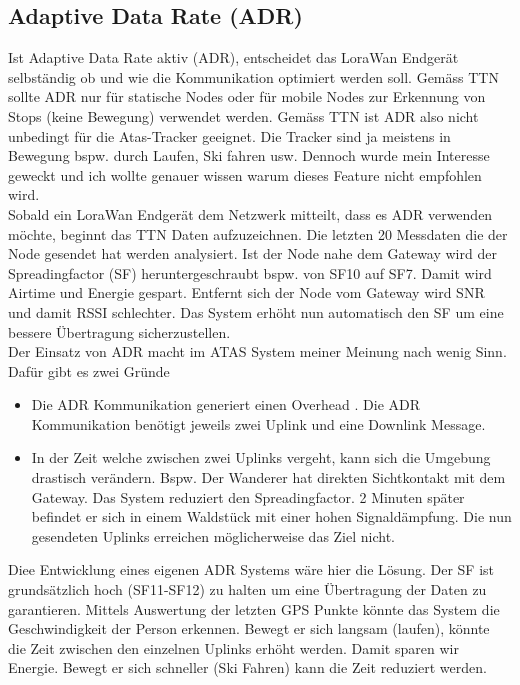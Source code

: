 \documentclass[11pt,english,german]{report}
\theoremstyle{definition}
\begin{document}
\subsection{Adaptive Data Rate (ADR)}
Ist Adaptive Data Rate aktiv (ADR), entscheidet das LoraWan Endgerät selbständig ob und wie die Kommunikation optimiert werden soll. Gemäss TTN \cite{ADRTTN} sollte ADR nur für statische Nodes oder für mobile Nodes zur Erkennung von Stops (keine Bewegung) verwendet werden. Gemäss TTN ist ADR also nicht unbedingt für die Atas-Tracker geeignet. Die Tracker sind ja meistens in Bewegung bspw. durch Laufen, Ski fahren usw. Dennoch wurde mein Interesse geweckt und ich wollte genauer wissen warum dieses Feature nicht empfohlen wird.\\[0.3cm]
Sobald ein LoraWan Endgerät dem Netzwerk mitteilt, dass es ADR verwenden möchte, beginnt das TTN Daten aufzuzeichnen. Die letzten 20 Messdaten die der Node gesendet hat werden analysiert. Ist der Node nahe dem Gateway wird der Spreadingfactor (SF) heruntergeschraubt bspw. von SF10 auf SF7. Damit wird Airtime und Energie gespart. Entfernt sich der Node vom Gateway wird SNR und damit RSSI schlechter. Das System erhöht nun automatisch  den SF um eine bessere Übertragung sicherzustellen.\\[0.3cm]
Der Einsatz von ADR macht im ATAS System meiner Meinung nach wenig Sinn. Dafür gibt es zwei Gründe
\begin{itemize}
	\item Die ADR Kommunikation generiert einen Overhead \cite{adroverhead}. Die ADR Kommunikation benötigt jeweils zwei Uplink und eine Downlink Message. 
	\item In der Zeit welche zwischen zwei Uplinks vergeht, kann sich die Umgebung drastisch verändern. Bspw. Der Wanderer hat direkten Sichtkontakt mit dem Gateway. Das System reduziert den Spreadingfactor. 2 Minuten später befindet er sich in einem Waldstück mit einer hohen Signaldämpfung. Die nun gesendeten Uplinks erreichen möglicherweise das Ziel nicht.
\end{itemize}Diee Entwicklung eines eigenen ADR Systems wäre hier die Lösung. Der SF ist grundsätzlich hoch (SF11-SF12) zu halten um eine Übertragung der Daten zu garantieren. Mittels Auswertung der letzten GPS Punkte könnte das System die Geschwindigkeit der Person erkennen. Bewegt er sich langsam (laufen), könnte die Zeit zwischen den einzelnen Uplinks erhöht werden. Damit sparen wir Energie. Bewegt er sich schneller (Ski Fahren) kann die Zeit reduziert werden. 
\end{document}
